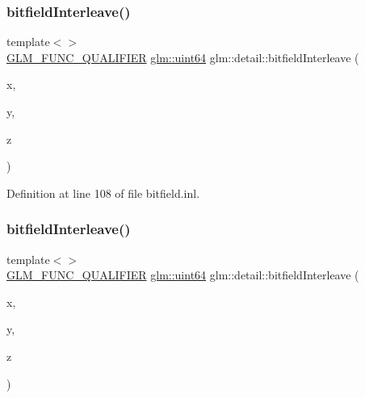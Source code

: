 \subsubsection{\texorpdfstring{bitfieldInterleave()}{bitfieldInterleave()}\hspace{0.1cm}{\footnotesize\ttfamily [8/11]}}
{\footnotesize\ttfamily template$<$$>$ \\
\mbox{\hyperlink{setup_8hpp_a33fdea6f91c5f834105f7415e2a64407}{G\+L\+M\+\_\+\+F\+U\+N\+C\+\_\+\+Q\+U\+A\+L\+I\+F\+I\+ER}} \mbox{\hyperlink{group__gtc__type__precision_gae3632bf9b37da66233d78930dd06378a}{glm\+::uint64}} glm\+::detail\+::bitfield\+Interleave (\begin{DoxyParamCaption}\item[{\mbox{\hyperlink{group__gtc__type__precision_gad8c2939e1fdd8e5828b31d95c52255d5}{glm\+::uint16}}}]{x,  }\item[{\mbox{\hyperlink{group__gtc__type__precision_gad8c2939e1fdd8e5828b31d95c52255d5}{glm\+::uint16}}}]{y,  }\item[{\mbox{\hyperlink{group__gtc__type__precision_gad8c2939e1fdd8e5828b31d95c52255d5}{glm\+::uint16}}}]{z }\end{DoxyParamCaption})}



Definition at line 108 of file bitfield.\+inl.

\mbox{\label{namespaceglm_1_1detail_a7f6421e0b1180ec986fd91d8eb2d1cc9}} 
\subsubsection{\texorpdfstring{bitfieldInterleave()}{bitfieldInterleave()}\hspace{0.1cm}{\footnotesize\ttfamily [9/11]}}
{\footnotesize\ttfamily template$<$$>$ \\
\mbox{\hyperlink{setup_8hpp_a33fdea6f91c5f834105f7415e2a64407}{G\+L\+M\+\_\+\+F\+U\+N\+C\+\_\+\+Q\+U\+A\+L\+I\+F\+I\+ER}} \mbox{\hyperlink{group__gtc__type__precision_gae3632bf9b37da66233d78930dd06378a}{glm\+::uint64}} glm\+::detail\+::bitfield\+Interleave (\begin{DoxyParamCaption}\item[{\mbox{\hyperlink{group__gtc__type__precision_ga202b6a53c105fcb7e531f9b443518451}{glm\+::uint32}}}]{x,  }\item[{\mbox{\hyperlink{group__gtc__type__precision_ga202b6a53c105fcb7e531f9b443518451}{glm\+::uint32}}}]{y,  }\item[{\mbox{\hyperlink{group__gtc__type__precision_ga202b6a53c105fcb7e531f9b443518451}{glm\+::uint32}}}]{z }\end{DoxyParamCaption})}



